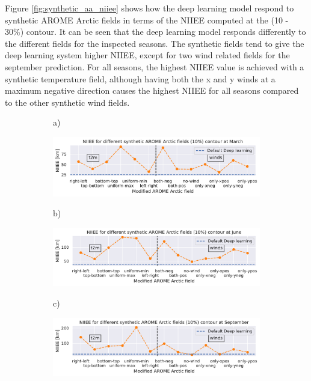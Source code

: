 \documentclass[../main/thesis.tex]{subfiles}
\begin{document}
Figure \ref{fig:synthetic_aa_niiee} shows how the deep learning model respond to synthetic AROME Arctic fields in terms of the NIIEE computed at the (10 - 30\%) contour. It can be seen that the deep learning model responds differently to the different fields for the inspected seasons. The synthetic fields tend to give the deep learning system higher NIIEE, except for two wind related fields for the september prediction. For all seasons, the highest NIIEE value is achieved with a synthetic temperature field, although having both the x and y winds at a maximum negative direction causes the highest NIIEE for all seasons compared to the other synthetic wind fields.

\begin{figure}
    \centering
    \begin{subfigure}[t]{.015\textwidth}
        a)
    \end{subfigure}
    \begin{subfigure}[t]{0.975\textwidth}
        \includegraphics[width=\textwidth, valign = t]{NIIEE_03.pdf}
    \end{subfigure}
    \begin{subfigure}[t]{.015\textwidth}
        b)
    \end{subfigure}
    \begin{subfigure}[t]{0.975\textwidth}
        \includegraphics[width=\textwidth, valign = t]{NIIEE_06.pdf}
    \end{subfigure}
    \begin{subfigure}[t]{.015\textwidth}
        c)
    \end{subfigure}
    \begin{subfigure}[t]{0.975\textwidth}
        \includegraphics[width=\textwidth, valign = t]{NIIEE_09.pdf}

\end{subfigure}
\end{figure}
\end{document}
